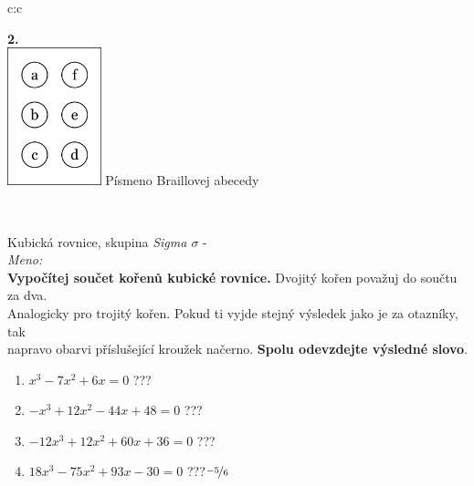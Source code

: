 \documentclass[10pt]{report}
\begin{document}
\begin{tabular}{c:c}
\begin{minipage}[c][99mm][t]{0.49\linewidth}
\begin{center}
\begin{minipage}{0.77\linewidth}
\begin{center}
\begin{varwidth}{\textwidth}
\end{varwidth}
\end{center}
\end{minipage}
\begin{minipage}{0.20\linewidth}
\begin{center}
{\Huge\bfseries 2.} \\[2mm]
\includegraphics[height=40mm]{../images/braille.png}
{\small Písmeno Braillovej abecedy}
\end{center}
\end{minipage}
\end{center}
\end{minipage}
\\ \hdashline
\begin{minipage}[c][99mm][t]{0.49\linewidth}
\begin{center}
\vspace{7mm}
{\huge Kubická rovnice, skupina \textit{Sigma $\sigma$} -}\\[4.5mm]
\textit{Meno:}\phantom{xxxxxxxxxxxxxxxxxxxxxxxxxxxxxxxxxxxxxxxxxxxxxxxxxxxxxxxxxxxxxxxxx}\\[3.5mm]
\textbf{Vypočítej součet kořenů kubické rovnice.} Dvojitý kořen považuj do součtu za dva.\\Analogicky pro trojitý kořen. Pokud ti vyjde stejný výsledek jako je za otazníky, tak\\napravo obarvi příslušející kroužek načerno. \textbf{Spolu odevzdejte výsledné slovo}.\\[3mm]
\begin{minipage}{0.77\linewidth}
\begin{center}
\begin{varwidth}{\textwidth}
\begin{enumerate}
\large
\item $x^3-7x^2+6x=0$\quad \dotfill\; ???\;\dotfill {}
\item $-x^3+12x^2-44x+48=0$\quad \dotfill\; ???\;\dotfill {}
\item $-12x^3+12x^2+60x+36=0$\quad \dotfill\; ???\;\dotfill {}
\item $18x^3-75x^2+93x-30=0$\quad \dotfill\; ???\;\dotfill \quad $\nicefrac{-5}{6}$

\end{enumerate}
\end{varwidth}
\end{center}
\end{minipage}
\end{center}
\end{minipage}
\end{tabular}
\end{document}
